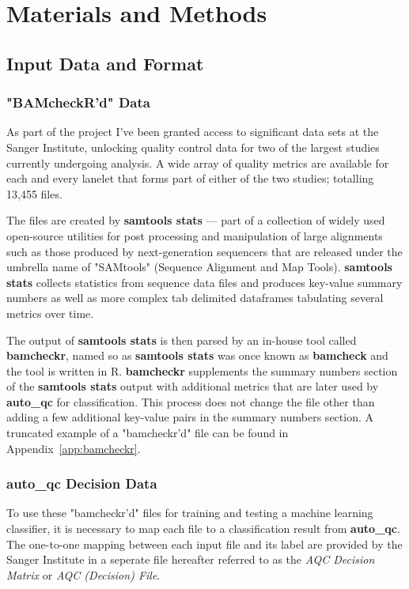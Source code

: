 \chapter{Materials and Methods}
\section{Input Data and Format}
\subsection{"BAMcheckR'd" Data}

As part of the project I've been granted access to significant data sets at the
Sanger Institute, unlocking quality control data for two of the largest studies
currently undergoing analysis. A wide array of quality metrics are available for
each and every lanelet that forms part of either of the two studies; totalling
13,455 files.


The files are created by \textbf{samtools stats} --- part of a collection of
widely used open-source utilities for post processing and manipulation of large
alignments such as those produced by next-generation sequencers that are
released under the umbrella name of "SAMtools"\citep{samtools} (Sequence Alignment and Map
Tools). \textbf{samtools stats} collects statistics from sequence data files %
and produces key-value summary numbers as well as more complex tab delimited
dataframes tabulating several metrics over time.

The output of \textbf{samtools stats} is then parsed by an in-house tool called
\textbf{bamcheckr}, named so as \textbf{samtools stats} was once known as
\textbf{bamcheck} and the tool is written in R. \textbf{bamcheckr} supplements
the summary numbers section of the \textbf{samtools stats} output with
additional metrics that are later used by \textbf{auto\_qc} for classification.
This process does not change the file other than adding a few additional
key-value pairs in the summary numbers section. A truncated example of a
"bamcheckr'd" file can be found in Appendix~\ref{app:bamcheckr}.

\subsection{auto\_qc Decision Data}
To use these "bamcheckr'd" files for training and testing a machine learning
classifier, it is necessary to map each file to a classification result from
\textbf{auto\_qc}. The one-to-one mapping between each input file and its label
are provided by the Sanger Institute in a seperate file hereafter referred to as
the \textit{AQC Decision Matrix} or \textit{AQC (Decision) File}.

